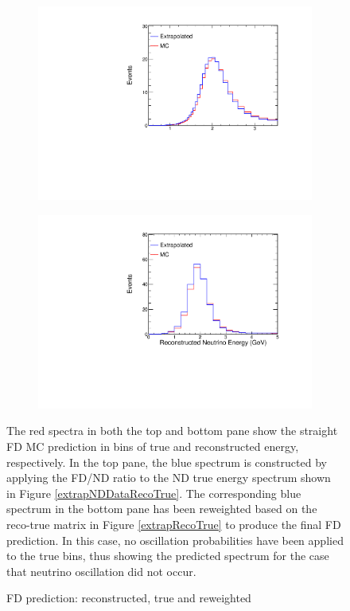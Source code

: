 \begin{figure}
\begin{center}
  \begin{subfigure}[b]{0.8\textwidth}
    \centering
    \includegraphics[width=\textwidth]{figures/plots/extrap/FDTrue.pdf}
  \end{subfigure}

  \begin{subfigure}[b]{0.8\textwidth}
    \centering
    \includegraphics[width=\textwidth]{figures/plots/extrap/FDReco.pdf}
  \end{subfigure}


\end{center}
\caption{FD prediction: reconstructed, true and reweighted}{
The red spectra in both the top and bottom pane show the straight FD MC
prediction in bins of true and  reconstructed energy, respectively.
In the top pane, the blue spectrum is constructed by applying
the FD/ND ratio to the ND true energy spectrum shown in Figure
\ref{extrapNDDataRecoTrue}.
The corresponding blue spectrum in the bottom pane has been reweighted
based on the reco-true matrix in Figure \ref{extrapRecoTrue} to produce the
final FD prediction.
In this case, no oscillation probabilities have been applied to the true bins,
thus showing the predicted spectrum for the case that neutrino oscillation
did not occur.
}
\label{extrapFDRecoTrue}
\end{figure}

